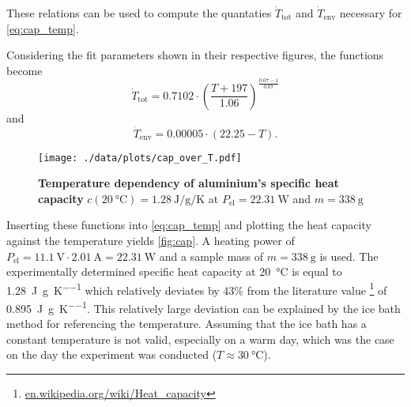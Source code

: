 These relations can be used to compute the quantaties $\dot{T}_\text{tot}$ and $\dot{T}_\text{env}$ necessary for \autoref{eq:cap_temp}.

Considering the fit parameters shown in their respective figures, the functions become
\begin{equation*}
	\dot{T}_\text{tot} = 0.7102\cdot\left(\frac{T+197}{1.06}\right)^{\frac{0.67-1}{0.67}}
\end{equation*}
and
\begin{equation*}
	\dot{T}_\text{env} = 0.00005\cdot(22.25-T).
\end{equation*}

\begin{figure}[tbp]
	\centering
	\texttt{[image: ./data/plots/cap\_over\_T.pdf]}
	\caption[Temperature dependency of aluminium's specific heat capacity]{\textbf{Temperature dependency of aluminium's specific heat capacity} $c(\SI{20}{\celsius})=\SI{1.28}{\joule\per\gram\per\kelvin}$ at $P_\text{el}=\SI{22.31}{\watt}$ and $m=\SI{338}{\gram}$}
	\label{fig:cap}
\end{figure}
Inserting these functions into \autoref{eq:cap_temp} and plotting the heat capacity against the temperature yields \autoref{fig:cap}.
A heating power of $P_\text{el}=\SI{11.1}{\volt}\cdot\SI{2.01}{\ampere} = \SI{22.31}{\watt}$ and a sample mass of $m=\SI{338}{\gram}$ is used.
The experimentally determined specific heat capacity at \SI{20}{\celsius} is equal to \SI{1.28}{\joule\per\gram\per\kelvin} which relatively deviates by \num{43}\% from the literature value \footnote{\url{en.wikipedia.org/wiki/Heat_capacity}} of \SI{0.895}{\joule\per\gram\per\kelvin}.
This relatively large deviation can be explained by the ice bath method for referencing the temperature.
Assuming that the ice bath has a constant temperature is not valid, especially on a warm day, which was the case on the day the experiment was conducted ($T\approx\SI{30}{\celsius}$).
